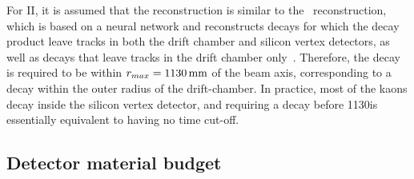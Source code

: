 
For \belle II, it is assumed that the \KS reconstruction is similar to {}the \belle\ \KS reconstruction, which is based on a neural network and reconstructs \KS decays for which the decay product leave tracks in both the drift chamber and silicon vertex detectors, as well as decays that leave tracks in the drift chamber only~\cite{BelleKSPaper,BelleKSThesis}. Therefore, the \KS decay is required to be within $r_{max}=1130\text{\,mm}$ of the beam axis, corresponding to a decay within the outer radius of the drift-chamber. In practice, most of the kaons decay inside the silicon vertex detector, and requiring a decay before 1130\mm is essentially equivalent to having no time cut-off.




\subsection{Detector material budget} %
\label{sub:detector_material_budget}

